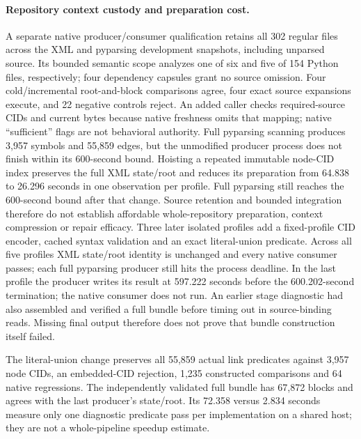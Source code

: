 \paragraph{Repository context custody and preparation cost.}
A separate native producer/consumer qualification retains all 302 regular files
across the XML and pyparsing development snapshots, including unparsed source.
Its bounded semantic scope analyzes one of six and five of 154 Python files,
respectively; four dependency capsules grant no source omission. Four
cold/incremental root-and-block comparisons agree, four exact source expansions
execute, and 22 negative controls reject. An added caller checks required-source
CIDs and current bytes because native freshness omits that mapping; native
``sufficient'' flags are not behavioral authority. Full pyparsing scanning
produces 3,957 symbols and 55,859 edges, but the unmodified producer process does
not finish within its 600-second bound. Hoisting a repeated immutable
node-CID index preserves the full XML state/root and reduces its preparation
from 64.838 to 26.296 seconds in one observation per profile. Full pyparsing
still reaches the 600-second bound after that change. Source retention and
bounded integration therefore do not establish affordable whole-repository
preparation, context compression or repair efficacy. Three later isolated
profiles add a fixed-profile CID encoder, cached syntax validation and an exact
literal-union predicate. Across all five profiles XML state/root identity is
unchanged and every native consumer passes; each full pyparsing producer still
hits the process deadline. In the last profile the producer writes its result
at 597.222 seconds before the 600.202-second termination; the native consumer
does not run. An earlier stage diagnostic had also assembled and verified a
full bundle before timing out in source-binding reads. Missing final output
therefore does not prove that bundle construction itself failed.

The literal-union change preserves all 55,859 actual link predicates against
3,957 node CIDs, an embedded-CID rejection, 1,235 constructed comparisons and
64 native regressions. The independently validated full bundle has 67,872
blocks and agrees with the last producer's state/root. Its 72.358 versus 2.834
seconds measure only one diagnostic predicate pass per implementation on a
shared host; they are not a whole-pipeline speedup estimate.

